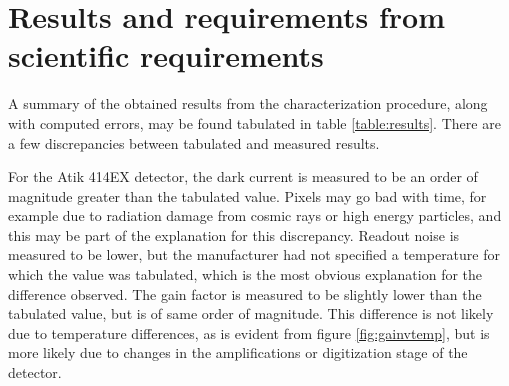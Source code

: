 \documentclass[../main.tex]{subfiles}
\begin{document}
	\section{Results and requirements from scientific requirements}\label{sec:firstreq}
	A summary of the obtained results from the characterization procedure, along with computed errors, may be found tabulated in table \ref{table:results}. There are a few discrepancies between tabulated and measured results. 
	
	For the Atik 414EX detector, the dark current is measured to be an order of magnitude greater than the tabulated value. Pixels may go bad with time, for example due to radiation damage from cosmic rays or high energy particles, and this may be part of the explanation for this discrepancy.
	Readout noise is measured to be lower, but the manufacturer had not specified a temperature for which the value was tabulated, which is the most obvious explanation for the difference observed. The gain factor is measured to be slightly lower than the tabulated value, but is of same order of magnitude. This difference is not likely due to temperature differences, as is evident from figure \ref{fig:gainvtemp}, but is more likely due to changes in the amplifications or digitization stage of the detector.
	
\end{document}
